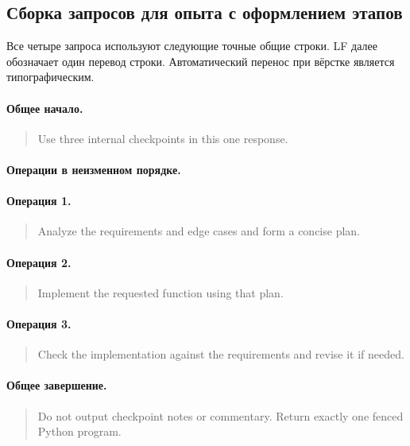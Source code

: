 \clearpage\subsection{Сборка запросов для опыта с оформлением этапов}
Все четыре запроса используют следующие точные общие строки. LF далее обозначает один перевод строки. Автоматический перенос при вёрстке является типографическим.
\paragraph{Общее начало.}\begin{quote}\small
Use three internal checkpoints in this one response.
\end{quote}

\paragraph{Операции в неизменном порядке.}
\paragraph*{Операция 1.}\begin{quote}\small
Analyze the requirements and edge cases and form a concise plan.
\end{quote}

\paragraph*{Операция 2.}\begin{quote}\small
Implement the requested function using that plan.
\end{quote}

\paragraph*{Операция 3.}\begin{quote}\small
Check the implementation against the requirements and revise it if needed.
\end{quote}

\paragraph{Общее завершение.}\begin{quote}\small
Do not output checkpoint notes or commentary. Return exactly one fenced Python program.
\end{quote}

